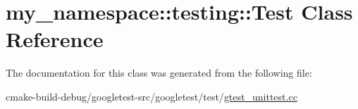 \hypertarget{classmy__namespace_1_1testing_1_1Test}{}\section{my\+\_\+namespace\+::testing\+::Test Class Reference}
\label{classmy__namespace_1_1testing_1_1Test}


The documentation for this class was generated from the following file\+:\begin{DoxyCompactItemize}
\item 
cmake-\/build-\/debug/googletest-\/src/googletest/test/\mbox{\hyperlink{gtest__unittest_8cc}{gtest\+\_\+unittest.\+cc}}\end{DoxyCompactItemize}

